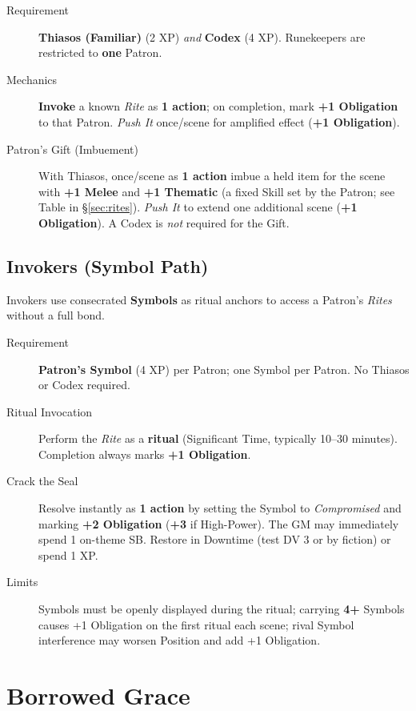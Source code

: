 \begin{description}
\item[Requirement] \textbf{Thiasos (Familiar)} (2 XP) \emph{and} \textbf{Codex} (4 XP). Runekeepers are restricted to \textbf{one} Patron.
\item[Mechanics] \textbf{Invoke} a known \emph{Rite} as \textbf{1 action}; on completion, mark \textbf{+1 Obligation} to that Patron. \emph{Push It} once/scene for amplified effect (\textbf{+1 Obligation}).
\item[Patron's Gift (Imbuement)] With Thiasos, once/scene as \textbf{1 action} imbue a held item for the scene with \textbf{+1 Melee} and \textbf{+1 Thematic} (a fixed Skill set by the Patron; see Table in \S\ref{sec:rites}). \emph{Push It} to extend one additional scene (\textbf{+1 Obligation}). A Codex is \emph{not} required for the Gift.
\end{description}

\subsection{Invokers (Symbol Path)}
\label{subsec:invokers}

Invokers use consecrated \textbf{Symbols} as ritual anchors to access a Patron’s \emph{Rites} without a full bond.

\begin{description}
\item[Requirement] \textbf{Patron's Symbol} (4 XP) per Patron; one Symbol per Patron. No Thiasos or Codex required.
\item[Ritual Invocation] Perform the \emph{Rite} as a \textbf{ritual} (Significant Time, typically 10–30 minutes). Completion always marks \textbf{+1 Obligation}.
\item[Crack the Seal] Resolve instantly as \textbf{1 action} by setting the Symbol to \emph{Compromised} and marking \textbf{+2 Obligation} (\textbf{+3} if High-Power). The GM may immediately spend 1 on-theme SB. Restore in Downtime (test DV 3 or by fiction) or spend 1 XP.
\item[Limits] Symbols must be openly displayed during the ritual; carrying \textbf{4+} Symbols causes +1 Obligation on the first ritual each scene; rival Symbol interference may worsen Position and add +1 Obligation.
\end{description}

\section*{Borrowed Grace}
\label{talent:borrowed-grace}

